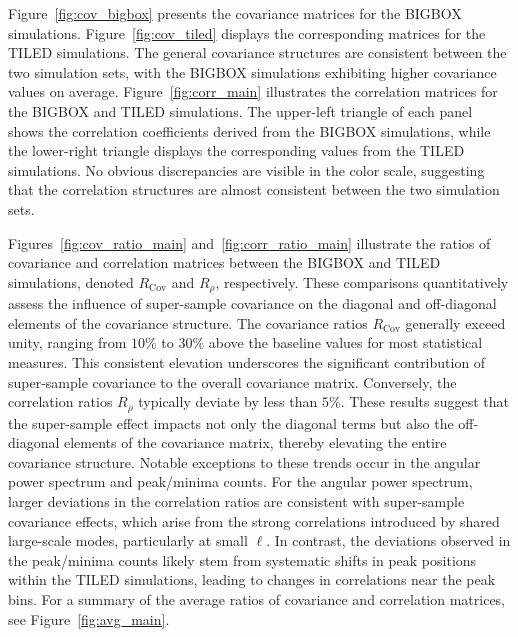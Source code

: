 Figure~\ref{fig:cov_bigbox} presents the covariance matrices for the BIGBOX simulations. Figure~\ref{fig:cov_tiled} displays the corresponding matrices for the TILED simulations. The general covariance structures are consistent between the two simulation sets, with the BIGBOX simulations exhibiting higher covariance values on average. Figure~\ref{fig:corr_main} illustrates the correlation matrices for the BIGBOX and TILED simulations. The upper-left triangle of each panel shows the correlation coefficients derived from the BIGBOX simulations, while the lower-right triangle displays the corresponding values from the TILED simulations. No obvious discrepancies are visible in the color scale, suggesting that the correlation structures are almost consistent between the two simulation sets.

Figures~\ref{fig:cov_ratio_main} and~\ref{fig:corr_ratio_main} illustrate the ratios of covariance and correlation matrices between the BIGBOX and TILED simulations, denoted $R_{\text{Cov}}$ and $R_{\rho}$, respectively. These comparisons quantitatively assess the influence of super-sample covariance on the diagonal and off-diagonal elements of the covariance structure. The covariance ratios $R_{\text{Cov}}$ generally exceed unity, ranging from $10\%$ to $30\%$ above the baseline values for most statistical measures. This consistent elevation underscores the significant contribution of super-sample covariance to the overall covariance matrix. Conversely, the correlation ratios $R_{\rho}$ typically deviate by less than $5\%$. These results suggest that the super-sample effect impacts not only the diagonal terms but also the off-diagonal elements of the covariance matrix, thereby elevating the entire covariance structure. Notable exceptions to these trends occur in the angular power spectrum and peak/minima counts. For the angular power spectrum, larger deviations in the correlation ratios are consistent with super-sample covariance effects, which arise from the strong correlations introduced by shared large-scale modes, particularly at small $\ell$. In contrast, the deviations observed in the peak/minima counts likely stem from systematic shifts in peak positions within the TILED simulations, leading to changes in correlations near the peak bins. For a summary of the average ratios of covariance and correlation matrices, see Figure~\ref{fig:avg_main}.

